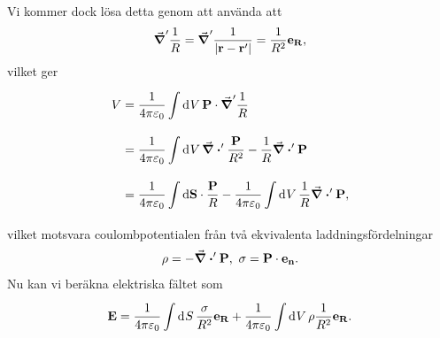 Vi kommer dock lösa detta genom att använda att
\begin{align*}
	\grad'{\frac{1}{R}} = \grad'{\frac{1}{\abs{\vb{r} - \vb{r}'}}} = \frac{1}{R^{2}}\vb{e}_{\vb{R}},
\end{align*}
vilket ger
\begin{align*}
	V &= \frac{1}{4\pi\varepsilon_{0}}\int\limits_{}^{}\dd[]{V}\vb{P}\cdot\grad'{\frac{1}{R}} \\
	  &= \frac{1}{4\pi\varepsilon_{0}}\int\limits_{}^{}\dd[]{V}\div'{\frac{\vb{P}}{R^{2}}} - \frac{1}{R}\div'{\vb{P}} \\
	  &= \frac{1}{4\pi\varepsilon_{0}}\int\limits_{}^{}\dd{\vb{S}}\cdot \frac{\vb{P}}{R} - \frac{1}{4\pi\varepsilon_{0}}\int\limits_{}^{}\dd[]{V}\frac{1}{R}\div'{\vb{P}},
\end{align*}
vilket motsvara coulombpotentialen från två ekvivalenta laddningsfördelningar
\begin{align*}
	\rho = -\div'{\vb{P}},\ \sigma = \vb{P}\cdot\vb{e}_{\vb{n}}.
\end{align*}
Nu kan vi beräkna elektriska fältet som
\begin{align*}
	\vb{E} = \frac{1}{4\pi\varepsilon_{0}}\int\limits_{}^{}\dd[]{S}\frac{\sigma}{R^{2}}\vb{e}_{\vb{R}} + \frac{1}{4\pi\varepsilon_{0}}\int\limits_{}^{}\dd[]{V}\rho\frac{1}{R^{2}}\vb{e}_{\vb{R}}.
\end{align*}